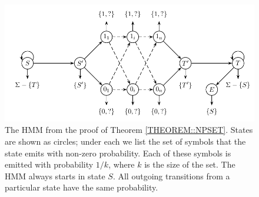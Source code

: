\begin{figure}
\centerline{\includegraphics[scale=0.68]{../figures/jcss/expandedcliquehmm.pdf}}
\caption[HMM for which set is NP-hard to optimize]{The HMM from the proof of Theorem
  \ref{THEOREM::NPSET}. States are shown as circles; under each we
  list the set of symbols that the state emits with non-zero
  probability. Each of these symbols is emitted with probability
  $1/k$, where $k$ is the size of the set. The HMM always starts in
  state $S$. All outgoing transitions from a particular state have
  the same probability.}\label{fig:set_hmm2}
\end{figure}

